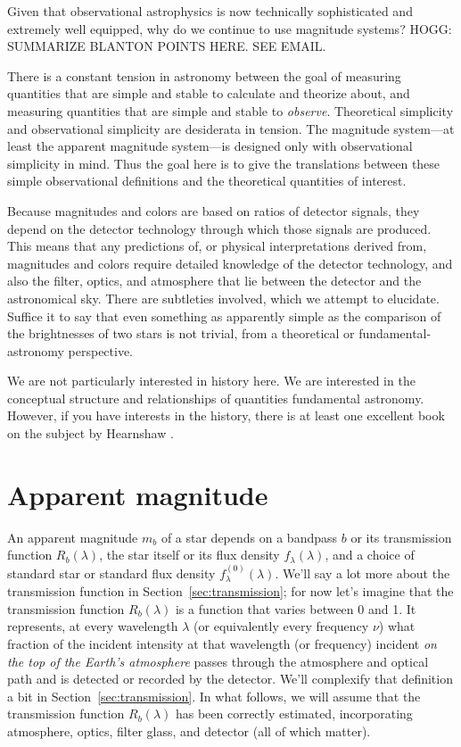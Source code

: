 \documentclass[10pt]{article}
\newcommand{\sectionname}{Section}
\newcommand{\secref}[1]{\sectionname~\ref{#1}}
\begin{document}
Given that observational astrophysics is now technically sophisticated and extremely well equipped, why do we continue to use magnitude systems?
HOGG: SUMMARIZE BLANTON POINTS HERE. SEE EMAIL.

There is a constant tension in astronomy between the goal of measuring quantities that are simple and stable to calculate and theorize about, and measuring quantities that are simple and stable to \emph{observe}.
Theoretical simplicity and observational simplicity are desiderata in tension.
The magnitude system---at least the apparent magnitude system---is designed only with observational simplicity in mind.
Thus the goal here is to give the translations between these simple observational definitions and the theoretical quantities of interest.

Because magnitudes and colors are based on ratios of detector signals, they depend on the detector technology through which those signals are produced.
This means that any predictions of, or physical interpretations derived from, magnitudes and colors require detailed knowledge of the detector technology, and also the filter, optics, and atmosphere that lie between the detector and the astronomical sky.
There are subtleties involved, which we attempt to elucidate.
Suffice it to say that even something as apparently simple as the comparison of the brightnesses of two stars is not trivial, from a theoretical or fundamental-astronomy perspective.

We are not particularly interested in history here.
We are interested in the conceptual structure and relationships of quantities fundamental astronomy.
However, if you have interests in the history, there is at least one excellent book on the subject by Hearnshaw \cite{hearnshaw}.

\section{Apparent magnitude}\label{sec:mag}

An apparent magnitude $m_b$ of a star depends on a bandpass $b$ or its transmission function $R_b(\lambda)$, the star itself or its flux density $f_\lambda(\lambda)$, and a choice of standard star or standard flux density $f^{(0)}_\lambda(\lambda)$.
We'll say a lot more about the transmission function in \secref{sec:transmission};
for now let's imagine that the transmission function $R_b(\lambda)$ is a function that varies between 0 and 1.
It represents, at every wavelength $\lambda$ (or equivalently every frequency $\nu$) what fraction of the incident intensity at that wavelength (or frequency) incident \emph{on the top of the Earth's atmosphere} passes through the atmosphere and optical path and is detected or recorded by the detector.
We'll complexify that definition a bit in \secref{sec:transmission}.
In what follows, we will assume that the transmission function $R_b(\lambda)$ has been correctly estimated, incorporating atmosphere, optics, filter glass, and detector (all of which matter).
\end{document}
